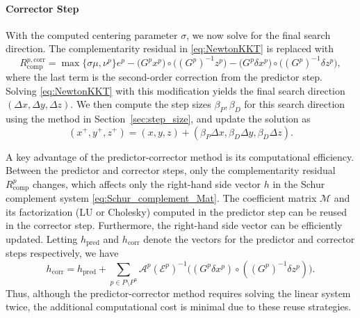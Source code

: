 \paragraph{Corrector Step}
With the computed centering parameter $\sigma$, we now solve for the final search direction.
The complementarity residual in \eqref{eq:NewtonKKT} is replaced with
\[R^{p,\text{corr}}_{\text{comp}}=\max\{\sigma \mu, \nu^p\} e^p - \big(G^p x^p\big) \circ \big((G^p)^{-1} z^p\big) - \big(G^p \delta x^p\big)\circ\big((G^p)^{-1} \delta z^p\big),\]
where the last term is the second-order correction from the predictor step.
Solving \eqref{eq:NewtonKKT} with this modification yields the final search direction $(\Delta x, \Delta y, \Delta z)$.
We then compute the step sizes $\beta_P, \beta_D$ for this search direction using the method in Section~\ref{sec:step_size}, and update the solution as
\[(x^+, y^+, z^+) = (x, y, z) + (\beta_P \Delta x, \beta_D \Delta y, \beta_D \Delta z).\]

\bigskip
A key advantage of the predictor-corrector method is its computational efficiency.
Between the predictor and corrector steps, only the complementarity residual $R^p_{\text{comp}}$ changes, which affects only the right-hand side vector $h$ in the Schur complement system \eqref{eq:Schur_complement_Mat}.
The coefficient matrix $\mathcal{M}$ and its factorization (LU or Cholesky) computed in the predictor step can be reused in the corrector step.
Furthermore, the right-hand side vector can be efficiently updated.
Letting $h_{\text{pred}}$ and $h_{\text{corr}}$ denote the vectors for the predictor and corrector steps respectively, we have
\[h_{\text{corr}}=h_{\text{pred}} + \sum_{p\in P\setminus P^{\text{u}}} \mathcal{A}^p (\mathcal{E}^p)^{-1} \big((G^p \delta x^p) \circ ((G^p)^{-1} \delta z^p) \big).\]
Thus, although the predictor-corrector method requires solving the linear system twice, the additional computational cost is minimal due to these reuse strategies.
